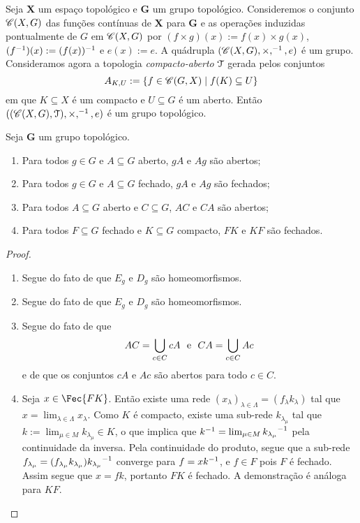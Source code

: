 \begin{ex}
Seja $\bm X$ um espaço topológico e $\bm G$ um grupo topológico. Consideremos o conjunto $\mathscr{C}(X,G)$ das funções contínuas de $\bm X$ para $\bm G$ e as operações induzidas pontualmente de $G$ em $\mathscr{C}(X,G)$ por $(f \times g)(x) := f(x) \times g(x)$, $(f^{-1})(x) := (f(x))^{-1}$ e $e(x) := e$. A quádrupla $(\mathscr{C}(X,G),\times,^{-1},e)$ é um grupo. Consideramos agora a topologia \emph{compacto-aberto} $\mathcal{T}$ gerada pelos conjuntos
	\begin{equation*}
	A_{K,U} := \left\{f \in \mathscr{C}(G,X) \;\middle\vert\; f(K) \subseteq U \right\}
	\end{equation*}
em que $K \subseteq X$ é um compacto e $U \subseteq G$ é um aberto. Então $((\mathscr{C}(X,G),\mathcal{T}),\times,^{-1},e)$ é um grupo topológico.
\end{ex}

\begin{prop}
Seja $\bm G$ um grupo topológico.
	\begin{enumerate}
	\item Para todos $g \in G$ e $A \subseteq G$ aberto, $gA$ e $Ag$ são abertos;
	\item Para todos $g \in G$ e $A \subseteq G$ fechado, $gA$ e $Ag$ são fechados;
	\item Para todos $A \subseteq G$ aberto e $C \subseteq G$, $AC$ e $CA$ são abertos;
	\item Para todos $F \subseteq G$ fechado e $K \subseteq G$ compacto, $FK$ e $KF$ são fechados.
	\end{enumerate}
\end{prop}
\begin{proof}
	\begin{enumerate}
	\item Segue do fato de que $E_g$ e $D_g$ são homeomorfismos.
	\item Segue do fato de que $E_g$ e $D_g$ são homeomorfismos.
	\item Segue do fato de que
		\begin{equation*}
		AC = \bigcup_{c \in C} cA \text{\ \ e\ \ } CA = \bigcup_{c \in C} Ac
		\end{equation*}
e de que os conjuntos $cA$ e $Ac$ são abertos para todo $c \in C$.
	\item Seja $x \in \Fec{FK}$. Então existe uma rede $(x_\lambda)_{\lambda \in \Lambda} = (f_\lambda k_\lambda)$ tal que $x = \lim_{\lambda \in \Lambda} x_\lambda$. Como $K$ é compacto, existe uma sub-rede $k_{\lambda_\mu}$ tal que $k := \lim_{\mu \in M} k_{\lambda_\mu} \in K$, o que implica que $k^{-1} = \lim_{\mu \in M} {k_{\lambda_\mu}}^{-1}$ pela continuidade da inversa. Pela continuidade do produto, segue que a sub-rede $f_{\lambda_\mu} = (f_{\lambda_\mu}k_{\lambda_\mu}){k_{\lambda_\mu}}^{-1}$ converge para $f = xk^{-1}$, e $f \in F$ pois $F$ é fechado. Assim segue que $x=fk$, portanto $FK$ é fechado. A demonstração é análoga para $KF$.
	\end{enumerate}
\end{proof}

